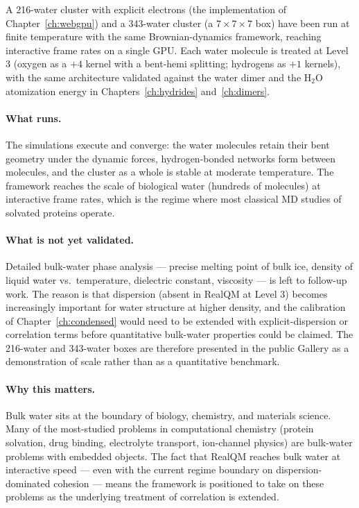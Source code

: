 A 216-water cluster with explicit electrons (the implementation of Chapter~\ref{ch:webgpu}) and a 343-water cluster (a $7 \times 7 \times 7$ box) have been run at finite temperature with the same Brownian-dynamics framework, reaching interactive frame rates on a single GPU. Each water molecule is treated at Level 3 (oxygen as a $+4$ kernel with a bent-hemi splitting; hydrogens as $+1$ kernels), with the same architecture validated against the water dimer and the H$_2$O atomization energy in Chapters~\ref{ch:hydrides} and~\ref{ch:dimers}.

\paragraph{What runs.}
The simulations execute and converge: the water molecules retain their bent geometry under the dynamic forces, hydrogen-bonded networks form between molecules, and the cluster as a whole is stable at moderate temperature. The framework reaches the scale of biological water (hundreds of molecules) at interactive frame rates, which is the regime where most classical MD studies of solvated proteins operate.

\paragraph{What is not yet validated.}
Detailed bulk-water phase analysis --- precise melting point of bulk ice, density of liquid water vs.\ temperature, dielectric constant, viscosity --- is left to follow-up work. The reason is that dispersion (absent in RealQM at Level 3) becomes increasingly important for water structure at higher density, and the calibration of Chapter~\ref{ch:condensed} would need to be extended with explicit-dispersion or correlation terms before quantitative bulk-water properties could be claimed. The 216-water and 343-water boxes are therefore presented in the public Gallery as a demonstration of scale rather than as a quantitative benchmark.

\paragraph{Why this matters.}
Bulk water sits at the boundary of biology, chemistry, and materials science. Many of the most-studied problems in computational chemistry (protein solvation, drug binding, electrolyte transport, ion-channel physics) are bulk-water problems with embedded objects. The fact that RealQM reaches bulk water at interactive speed --- even with the current regime boundary on dispersion-dominated cohesion --- means the framework is positioned to take on these problems as the underlying treatment of correlation is extended.

